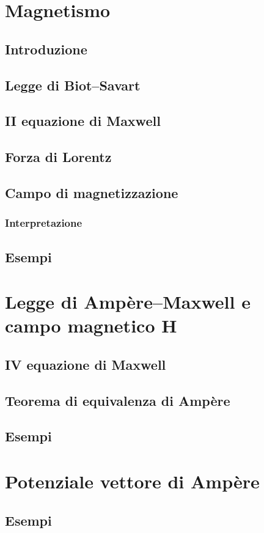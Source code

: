 \documentclass{book}
\begin{document}
\chapter{Magnetismo}
\section{Introduzione}
\section{Legge di Biot--Savart}
\section{II equazione di Maxwell}
\section{Forza di Lorentz}
\section{Campo di magnetizzazione}
\subsection{Interpretazione}
\section{Esempi}

\chapter{Legge di Amp\`ere--Maxwell e campo magnetico $\mathbf{H}$}
\section{IV equazione di Maxwell}
\section{Teorema di equivalenza di Amp\`ere}
\section{Esempi}

\chapter{Potenziale vettore di Amp\`ere}
\section{Esempi}
\end{document}
